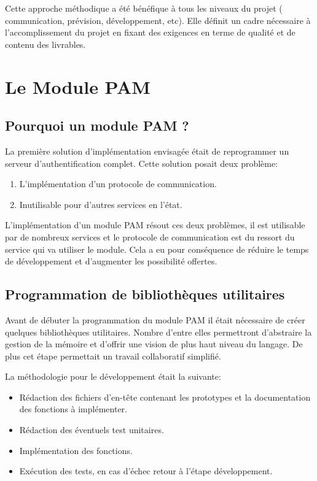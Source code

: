     Cette approche méthodique a été bénéfique à tous les niveaux du projet (
    communication, prévision, développement, etc). Elle définit un cadre
    nécessaire à l'accomplissement du projet en fixant des exigences en terme
    de qualité et de contenu des livrables.


\newpage
\section{Le Module PAM}
\subsection{Pourquoi un module PAM ?}
La première solution d'implémentation envisagée était de reprogrammer un
serveur d'authentification complet. Cette solution posait deux problème:
\begin{enumerate}
  \item L'implémentation d'un protocole de communication.
  \item Inutilisable pour d'autres services en l'état.
\end{enumerate}

L'implémentation d'un module PAM résout ces deux problèmes, il est utilisable
par de nombreux services et le protocole de communication est du ressort du
service qui va utiliser le module. Cela a eu pour conséquence de réduire le
temps de développement et d'augmenter les possibilité offertes.

\subsection{Programmation de bibliothèques utilitaires}
Avant de débuter la programmation du module PAM il était nécessaire de créer
quelques bibliothèques utilitaires. Nombre d'entre elles permettront
d'abstraire la gestion de la mémoire et d'offrir une vision de plus haut niveau
du langage. De plus cet étape permettait un travail collaboratif simplifié.

La méthodologie pour le développement était la suivante:
\begin{itemize}
  \item Rédaction des fichiers d'en-tête contenant les prototypes et la
  documentation des fonctions à implémenter.
  \item Rédaction des éventuels test unitaires.
  \item Implémentation des fonctions.
  \item Exécution des tests, en cas d'échec retour à l'étape développement.
\end{itemize}

